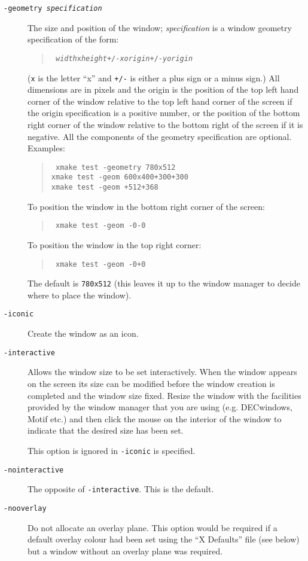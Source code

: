 \begin{description}
\item[\tt -geometry {\em specification}] The size and position of the window;
{\em specification} is a window geometry specification of the form:
\begin{quote}\tt
{\em width}x{\em height}+/-{\em xorigin}+/-{\em yorigin}
\end{quote}
({\tt x} is the letter ``x'' and {\tt +/-} is either a plus sign or a
minus sign.)
All dimensions are in pixels and the origin is the position of the top left hand
corner of the window relative to the top left hand corner of the screen
if the origin specification is a positive number, or the position of the
bottom right corner of the window relative to the bottom right of the
screen if it is negative. All
the components of the geometry specification are optional. Examples:
\begin{quote}\tt
xmake test -geometry 780x512\\
xmake test -geom 600x400+300+300\\
xmake test -geom +512+368
\end{quote}
To position the window in the bottom right corner of the screen:
\begin{quote}\tt
xmake test -geom -0-0
\end{quote}
To position the window in the top right corner:
\begin{quote}\tt
xmake test -geom -0+0
\end{quote}
The default is {\tt 780x512} (this leaves it up to the window manager to
decide where to place the window). 

\item[\tt -iconic] Create the window as an icon.

\item[\tt -interactive] Allows the window size to be set interactively. When
the window appears on the screen its size can be modified before the window
creation is completed and the window size fixed. Resize the window with the
facilities provided by the window manager that you are using (e.g. DECwindows,
Motif etc.) and then click the mouse on the
interior of the window to indicate that the desired size has been set.

This option is ignored in {\tt -iconic} is specified.

\item[\tt -nointeractive] The opposite of {\tt -interactive}. This is
the default.

\item[\tt -nooverlay] Do not allocate an overlay plane. This option
would be required if a default overlay colour had been set using the ``X
Defaults'' file (see below) but a window without an overlay plane was
required.


\end{description}
